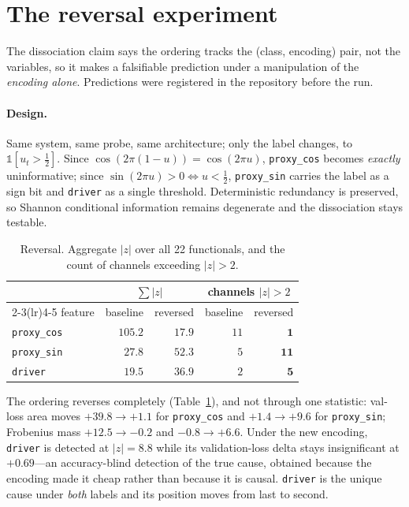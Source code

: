 \section{The reversal experiment}\label{sec:reversal}

The dissociation claim says the ordering tracks the (class, encoding) pair, not
the variables, so it makes a falsifiable prediction under a manipulation of the
\emph{encoding alone}. Predictions were registered in the repository before the
run.

\paragraph{Design.} Same system, same probe, same architecture; only the label
changes, to $\mathbb{1}[u_t > \tfrac12]$. Since
$\cos(2\pi(1-u)) = \cos(2\pi u)$, \texttt{proxy\_cos} becomes \emph{exactly}
uninformative; since $\sin(2\pi u) > 0 \iff u < \tfrac12$, \texttt{proxy\_sin}
carries the label as a sign bit and \texttt{driver} as a single threshold.
Deterministic redundancy is preserved, so Shannon conditional information
remains degenerate and the dissociation stays testable.

\begin{table}[t]\centering\small
\caption{Reversal. Aggregate $|z|$ over all 22 functionals, and the count of
channels exceeding $|z|>2$.}
\label{tab:reversal}
\begin{tabular}{lrrrr}
\toprule
& \multicolumn{2}{c}{$\sum|z|$} & \multicolumn{2}{c}{channels $|z|>2$} \\
\cmidrule(lr){2-3}\cmidrule(lr){4-5}
feature & baseline & reversed & baseline & reversed \\
\midrule
\texttt{proxy\_cos} & $\mathbf{105.2}$ & $17.9$  & $11$ & $\mathbf{1}$ \\
\texttt{proxy\_sin} & $27.8$  & $\mathbf{52.3}$  & $5$  & $\mathbf{11}$ \\
\texttt{driver}     & $19.5$  & $36.9$           & $2$  & $\mathbf{5}$ \\
\bottomrule
\end{tabular}
\end{table}

The ordering reverses completely (Table~\ref{tab:reversal}), and not through one
statistic: val-loss area moves $+39.8 \to +1.1$ for \texttt{proxy\_cos} and
$+1.4 \to +9.6$ for \texttt{proxy\_sin}; Frobenius mass $+12.5 \to -0.2$ and
$-0.8 \to +6.6$. Under the new encoding, \texttt{driver} is detected at
$|z| = 8.8$ while its validation-loss delta stays insignificant at $+0.69$---an
accuracy-blind detection of the true cause, obtained because the encoding made
it cheap rather than because it is causal. \texttt{driver} is the unique cause
under \emph{both} labels and its position moves from last to second.

